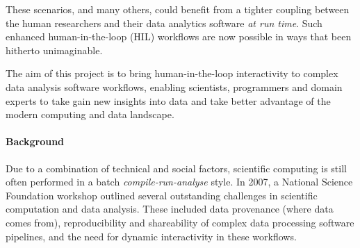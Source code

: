 \documentclass[a4paper]{scrartcl}
\begin{document}
These scenarios, and many others, could benefit from a tighter
coupling between the human researchers and their data analytics
software \emph{at run time}. Such enhanced human-in-the-loop (HIL)
workflows are now possible in ways that been hitherto unimaginable.

The aim of this project is to bring human-in-the-loop interactivity to
complex data analysis software workflows, enabling scientists,
programmers and domain experts to take gain new insights into data and
take better advantage of the modern computing and data landscape.


\paragraph*{Background}

Due to a combination of technical and social factors, scientific
computing is still often performed in a batch
\emph{compile-run-analyse} style. In 2007, a National Science
Foundation workshop\parencite{Gil2007} outlined several outstanding
challenges in scientific computation and data analysis. These included
data provenance (where data comes from\cite{McPhillips2009}),
reproducibility and shareability of complex data processing software
pipelines, and the need for dynamic interactivity in these workflows.
\end{document}
